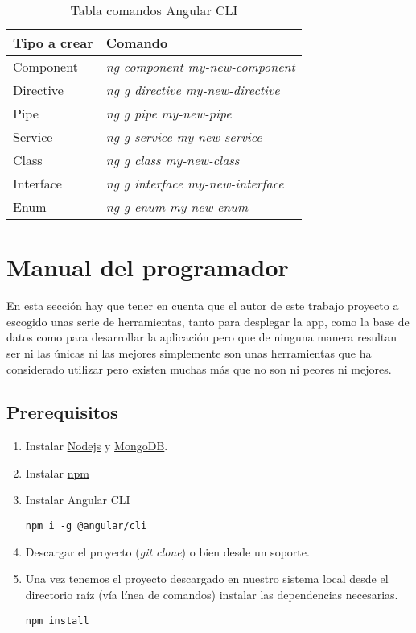    
\begin{table}[htbp]
\begin{center}
\begin{tabular}{|l|l|}
\hline
Tipo a crear & Comando  \\
\hline \hline
Component & \emph{ng component my-new-component}  \\ \hline
Directive & \emph{ng g directive my-new-directive}  \\ \hline
Pipe & \emph{ng g pipe my-new-pipe}  \\ \hline
Service & \emph{ng g service my-new-service}  \\ \hline
Class & \emph{ng g class my-new-class}  \\ \hline
Interface & \emph{ng g interface my-new-interface}  \\ \hline
Enum & \emph{ng g enum my-new-enum}  \\ \hline
\end{tabular}
\caption{Tabla comandos Angular CLI}
\end{center}
\end{table}
   


\section{Manual del programador}
En esta sección hay que tener en cuenta que el autor de este trabajo proyecto a escogido unas serie de herramientas, tanto para desplegar la app, como la base de datos como para desarrollar la aplicación pero que de ninguna manera resultan ser ni las únicas ni las mejores simplemente son unas herramientas que ha considerado utilizar pero existen muchas más que no son ni peores ni mejores.

\subsection{Prerequisitos}
\begin{enumerate}
	\item Instalar \href{https://nodejs.org/en/}{Nodejs} y \href{https://www.mongodb.com/}{MongoDB}.
	\item Instalar \href{https://www.npmjs.com/}{npm}
	\item Instalar Angular CLI
		\lstset{language=C, breaklines=true, basicstyle=\footnotesize}
		\begin{lstlisting}[frame=single]
		npm i -g @angular/cli
    	\end{lstlisting}
    \item Descargar el proyecto (\emph{git clone}) o bien desde un soporte.
	\item Una vez tenemos el proyecto descargado en nuestro sistema local desde el directorio raíz (vía línea de comandos) instalar las dependencias necesarias.
	\lstset{language=C, breaklines=true, basicstyle=\footnotesize}
		\begin{lstlisting}[frame=single]
		npm install
    	\end{lstlisting}
\end{enumerate}


